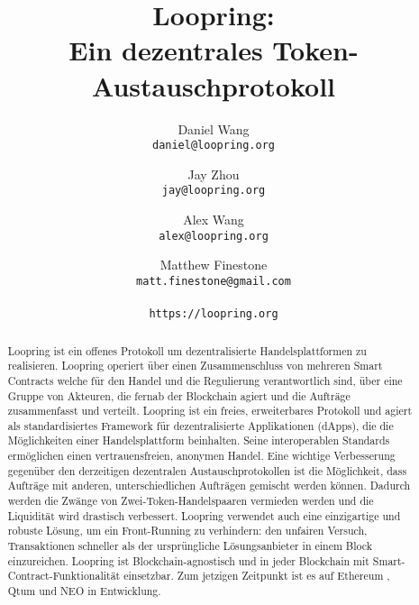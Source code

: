 \documentclass[UTF8,nofonts]{article}
\title{\textbf{Loopring:}\\\textbf{Ein dezentrales Token-Austauschprotokoll}}
\author{
 Daniel Wang\\
  \texttt{daniel@loopring.org}\\
  \and
  	Jay Zhou\\
  	\texttt{jay@loopring.org}\\
  	\and
  	Alex Wang\\
  	\texttt{alex@loopring.org}\\
  	\and
  	Matthew Finestone\\
  	\texttt{matt.finestone@gmail.com}\\ 
  \\
  \texttt{https://loopring.org}
 }
\begin{document}
\maketitle


\begin{abstract}
Loopring ist ein offenes Protokoll um dezentralisierte Handelsplattformen zu realisieren. Loopring operiert über einen Zusammenschluss von mehreren Smart Contracts welche für den Handel und die Regulierung verantwortlich sind, über eine Gruppe von Akteuren, die fernab der Blockchain agiert und die Aufträge zusammenfasst und verteilt. Loopring ist ein freies, erweiterbares Protokoll und agiert als standardisiertes Framework für dezentralisierte Applikationen (dApps), die die Möglichkeiten einer Handelsplattform beinhalten. Seine interoperablen Standards ermöglichen einen vertrauensfreien, anonymen Handel. Eine wichtige Verbesserung gegenüber den derzeitigen dezentralen Austauschprotokollen ist die Möglichkeit, dass Aufträge mit anderen, unterschiedlichen Aufträgen gemischt werden können. Dadurch werden die Zwänge von Zwei-Token-Handelspaaren vermieden werden und die Liquidität wird drastisch verbessert. Loopring verwendet auch eine einzigartige und robuste Lösung, um ein Front-Running zu verhindern: den unfairen Versuch, Transaktionen schneller als der ursprüngliche Lösungsanbieter in einem Block einzureichen. Loopring ist Blockchain-agnostisch und in jeder Blockchain mit Smart-Contract-Funktionalität einsetzbar. Zum jetzigen Zeitpunkt ist es auf Ethereum \cite{buterin2017ethereum} \cite{wood2014ethereum}, Qtum \cite{dai2017smart} und NEO \cite{atterlonn2018distributed} in Entwicklung.
\end{abstract}
\end{document}
